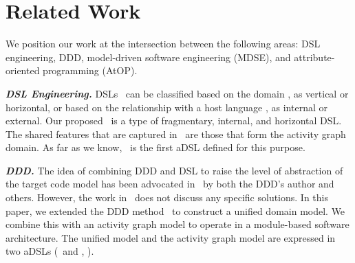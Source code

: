 %
\section{Related Work}\label{sect:relatedwork} %
We position our work at the intersection between the following areas: DSL engineering, DDD, model-driven software engineering (MDSE), and attribute-oriented programming (AtOP).

\textbf{\textit{DSL Engineering.}}
DSLs~\cite{van_deursen_domain-specific_2000, mernik_when_2005} can be classified based on the domain \cite{kleppe_software_2008}, as vertical or horizontal, or based on the relationship with a host language \cite{fowler_domain-specific_2010, van_deursen_domain-specific_2000, mernik_when_2005}, as internal or external. 
%
Our proposed \agl~is a type of fragmentary, internal, and horizontal DSL. The shared features that are captured in \agl~are those that form the activity graph domain. As far as we know, \agl~is the first aDSL defined for this purpose.

\textbf{\textit{DDD.}}
The idea of combining DDD and DSL to raise the level of 
abstraction of the target code model has been advocated in~\cite{fowler_domain-specific_2010} by both the DDD's author and others. However, the work in~\cite{fowler_domain-specific_2010} does not discuss any specific solutions.
In this paper, we extended the DDD method~\cite{evans_domain-driven_2004} to construct a unified domain model. We combine this with an activity graph model to operate in a module-based software architecture. The unified model and the activity graph model are expressed in two aDSLs (\dcsl~and \agl, \resp).

